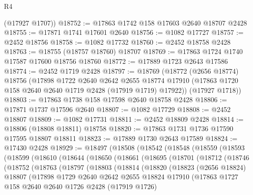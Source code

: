 \begin{lexlean}{R4}
\begin{coremodule}
      (@17927 @1707))
@18752 := @17863 @1742 @158 @17603 @2640 @18707 @2428
@18755 := @17871 @1741 @17601 @2640
@18756 := @1082 @17727
@18757 := @2452 @18756
@18758 := @1082 @17732
@18760 := @2452 @18758 @2428
@18763 := @18755 (@18757 @18760) @18707
@18769 := @17863 @1724 @1740 @17587 @17600 @18756 @18760
@18772 := @17889 @1723 @2643 @17586
@18774 := @2452 @1719 @2428
@18797 := @18769
    (@18772
      (@2656 @18774)
      @18756
      (@17898
        @1722
        @2640
        @2642
        @2655
        @18774
        @17910
        (@17863 @1720 @158 @2640 @2640 @1719 @2428 (@17919 @1719) @17922))
      (@17927 @1718))
@18803 := @17863 @1738 @158 @17598 @2640 @18758 @2428
@18806 := @17871 @1737 @17596 @2640
@18807 := @1082 @17729
@18808 := @2452 @18807
@18809 := @1082 @17731
@18811 := @2452 @18809 @2428
@18814 := @18806 (@18808 @18811) @18758
@18820 := @17863 @1731 @1736 @17590 @17595 @18807 @18811
@18823 := @17889 @1730 @2643 @17589
@18824 := @17430 @2428
@18929 := @18497
    (@18508
      (@18542
        (@18548
          (@18559
            (@18593
              (@18599
                (@18610
                  (@18644
                    (@18650
                      (@18661
                        (@18695
                          (@18701
                            (@18712
                              (@18746
                                (@18752
                                  (@18763
                                    (@18797
                                      (@18803
                                        (@18814
                                          (@18820
                                            (@18823
                                              (@2656 @18824)
                                              @18807
                                              (@17898
                                                @1729
                                                @2640
                                                @2642
                                                @2655
                                                @18824
                                                @17910
                                                (@17863
                                                  @1727
                                                  @158
                                                  @2640
                                                  @2640
                                                  @1726
                                                  @2428
                                                  (@17919 @1726)

\end{coremodule}
\end{lexlean}
